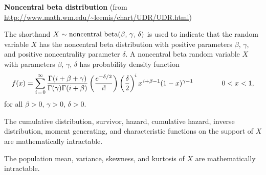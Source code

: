 \documentclass[12pt,fullpage]{article}
\begin{document}
\noindent
{\bf Noncentral beta distribution} (from \color{blue}\url{http://www.math.wm.edu/~leemis/chart/UDR/UDR.html}\color{black})

\noindent
The shorthand $X \sim {\rm noncentral\ beta}(\beta,\, \gamma,\, \delta)$ is used to indicate that the
random variable $X$ has the noncentral beta distribution with positive parameters $\beta$, $\gamma$, and positive noncentrality parameter $\delta$.
A noncentral beta random variable $X$ with parameters $\beta$, $\gamma$, $\delta$ has probability density function 
$$
f(x) = \displaystyle\sum_{i \kern 0.08 em = \kern 0.08 em 0} ^ {\infty} \frac{\Gamma(i + \beta + \gamma)} {\Gamma (\gamma) \Gamma(i + \beta)}
\left(\frac{e ^ {-\delta / 2}} {i!} \right) \left(\frac{\delta} {2} \right) ^ { \kern -0.08 em i} x ^ {\kern 0.08 em i + \beta - 1} (1 - x) ^ {\gamma - 1} \qquad \qquad 0 < x < 1,
$$
for all $\beta > 0$, $\gamma > 0$, $\delta > 0$.

\vspace{0.1in}
\noindent
The cumulative distribution, survivor, hazard, cumulative hazard, 
inverse distribution, moment generating, and characteristic functions on
the support of $X$ are mathematically intractable.

\vspace{0.1in}
\noindent
The population mean, variance, skewness, and kurtosis of $X$ are mathematically intractable.

\vspace{0.1in}

\noindent
\end{document}
